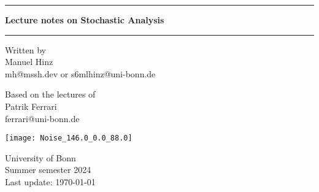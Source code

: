 \documentclass[a4paper, 10pt, oneside]{book}
\author{Manuel Hinz}
\begin{document}
\pagecolor{mycolor}
\begin{titlepage}
    \centering

    \vspace*{1cm}

    \rule{\textwidth}{1pt}

    \vspace{.7\baselineskip}
    {\huge \textbf{Lecture notes on Stochastic Analysis}}

    
    \rule{\textwidth}{1pt}

    \vspace{1.5cm}

    \large

    \begin{minipage}{.5\textwidth}
        \centering
        Written by \\
        Manuel Hinz\\
        {\normalsize mh@mssh.dev or s6mlhinz@uni-bonn.de}
    \end{minipage}%
    \begin{minipage}{.5\textwidth}
        \centering
        Based on the lectures of\\
        Patrik Ferrari \\
        {\normalsize ferrari@uni-bonn.de}
    \end{minipage}


    \vspace{3cm}

    \texttt{[image: Noise\_146.0\_0.0\_88.0]}

    \vfill

    University of Bonn \\
    Summer semester 2024\\
    Last update: \today
   
\end{titlepage}
\pagecolor{white}
\tableofcontents

\restoregeometry
\end{document}
